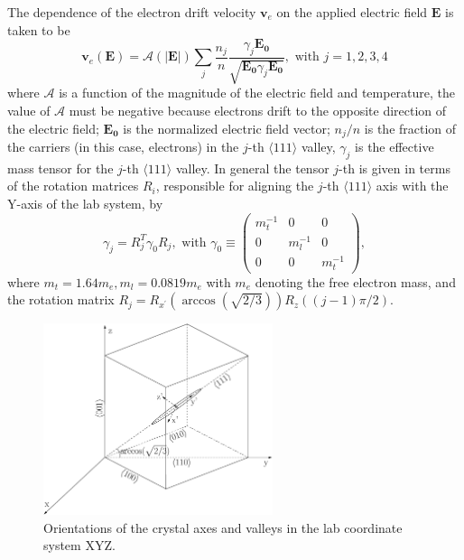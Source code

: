 The dependence of the electron drift velocity $\mathbf{v}_{e}$ on the applied electric field $\mathbf{E}$ is taken to be
\begin{equation}
  \label{eq:ed}
  \mathbf{v}_{e}(\mathbf{E}) = \mathcal{A}(|\mathbf{E}|) \sum_{j} \frac{n_{j}}{n}     \frac{\gamma_{j}\mathbf{E_{0}}}     {\sqrt{\mathbf{E_{0}}\gamma_{j}\mathbf{E_{0}}}},  \mbox{ with }     j=1,2,3,4
\end{equation}
where $\mathcal{A}$ is a function of the magnitude of the electric field and temperature, the value of $\mathcal{A}$ must be negative because electrons drift to the opposite direction of the electric field; $\mathbf{E_{0}}$ is the normalized electric field vector; $n_{j}/n$ is the fraction  of the carriers (in this case, electrons) in the $j$-th $\langle111\rangle$ valley, $\gamma_{j}$ is the effective mass tensor for the $j$-th $\langle111\rangle$ valley. In general the tensor $j$-th is given in terms of the rotation matrices $R_{i}$, responsible for aligning the $j$-th $\langle 111 \rangle$ axis with the Y-axis of the lab system, by
\begin{equation}
  \label{eq:gammas}
  \gamma_{j} = R_{j}^{T}\gamma_{0}R_{j}, \mbox{ with } \gamma_{0}   \equiv \left(
    \begin{array}{ccc}
      m_{t}^{-1} & 0 & 0 \\
      0 & m_{l}^{-1} & 0 \\
      0 & 0 & m_{t}^{-1}
    \end{array} \right),
\end{equation}
where $m_{t} = 1.64m_{e}, m_{l} = 0.0819m_{e}$ with $m_{e}$ denoting the free electron mass, and the rotation matrix $R_{j} = R_{x^{\prime}}(\arccos(\sqrt{2/3}))R_{z}((j-1)\pi/2)$.

\begin{figure}[tbhp]
  \centering
  \includegraphics[width=0.6\textwidth]{axes.eps}  
  \caption{Orientations of the crystal axes and valleys in the lab coordinate system XYZ.}
  \label{fig:axes}
\end{figure}

